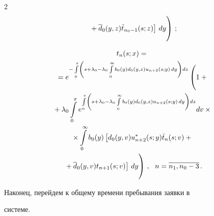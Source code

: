 \begin{multicols}{2}
\begin{multline*}
\left.\left.{}+\d_0(y,z) \tilde{t}_{n_0-1}(s;z)\right] \, dy


\vphantom{\int\limits_0^x}


\right)\,;


\end{multline*}







\vspace*{-12pt}





\noindent


\begin{multline*}




t_n(s;x) = {}\\


{}=e^{- \int\limits_0^x \left(


s + \lambda_0 - \lambda_0 \int\limits_0^\infty b_0(y) d_0(y,z) u_{n+2}(s;y) \, dy\right)dz}


\left(  \vphantom{\int\limits_0^x}


1 +{}\right.\\


{}+ \lambda_0 \int\limits_0^x e^{ \int\limits_0^v \left(


s + \lambda_0 - \lambda_0 \int\limits_0^\infty b_0(y) d_0(y,z) u_{n+2}(s;y) \, dy \right)dz}


dv \times{}\\


{}\times


\int\limits_0^\infty b_0(y) \left[d_0(y,v) u_{n+2}^*(s;y) \tilde{t}_n(s;v)


+{}\right.\\


\left.\left.{}+ \d_0(y,v) t_{n+1}(s;v)\right] \, dy 


\vphantom{\int\limits_0^x}


\right)\,,


\ \ n=\overline{n_1,n_0-3}\,.


\end{multline*}







Наконец, перейдем к общему времени пребывания заявки в


системе.



\end{multicols}
